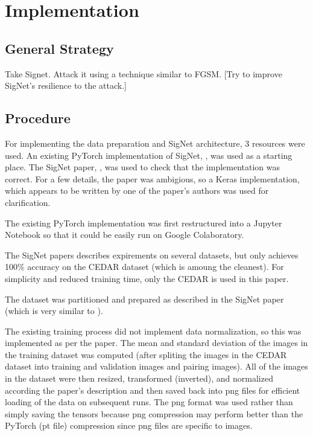 \section{Implementation}\label{sec:implementation}


\subsection{General Strategy}

Take Signet.
Attack it using a technique similar to FGSM.
[Try to improve SigNet's resilience to the attack.]


\subsection{Procedure}

For implementing the data preparation and SigNet architecture, 3 resources were used.
An existing PyTorch implementation of SigNet, \cite{GitHub_signet_pytorch}, was used as a starting place.
The SigNet paper, \cite{sig_net}, was used to check that the implementation was correct.
For a few details, the paper was ambigious, so a Keras implementation, \cite{GitHub_sounakdey} which appears to be written by one of the paper's authors was used for clarification.

The existing PyTorch implementation was first restructured into a Jupyter Notebook so that it could be easily run on Google Colaboratory.

The SigNet papers describes expirements on several datasets, but only achieves 100\% accuracy on the CEDAR dataset (which is amoung the cleanest).
For simplicity and reduced training time, only the CEDAR is used in this paper.

The dataset was partitioned and prepared as described in the SigNet paper (which is very similar to \cite{LeCun}).

The existing training process did not implement data normalization, so this was implemented as per the paper.
The mean and standard deviation of the images in the training dataset was computed (after spliting the images in the CEDAR dataset into training and validation images and pairing images).
All of the images in the dataset were then resized, transformed (inverted), and normalized according the paper's description and then saved back into png files for efficient loading of the data on subsequent runs.
The png format was used rather than simply saving the tensors because png compression may perform better than the PyTorch (pt file) compression since png files are specific to images.


